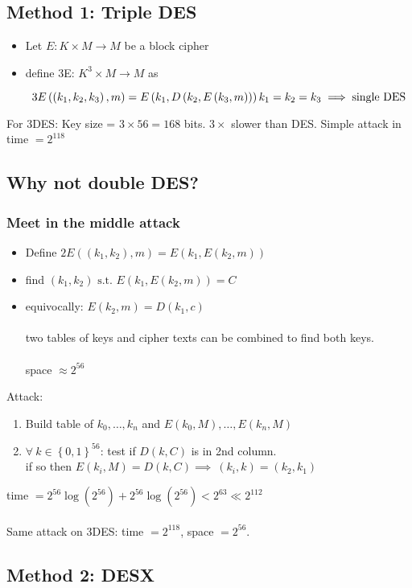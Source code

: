 \documentclass[a4paper]{article}
\begin{document}
	\subsection{Method 1: Triple DES}
	\begin{itemize}
		\item Let $E:K \times M \to M$ be a block cipher
		\item define 3E: $K^3\times M \to M$ as
			\begin{center}
				\[
				3E\left( \left( k_1,k_2,k_3 \right) ,m\right) 
				=E\left( k_1,D\left( k_2,E\left( k_3,m \right)  \right)  \right) \\
				k_1=k_2=k_3 \implies \text{single DES}
				\] 
			\end{center}
	\end{itemize}
	For 3DES: Key size = $3\times 56 = 168$ bits. $3\times $ slower than DES.
	Simple attack in time $=2^{118}$

	\subsection{Why not double DES?}
	\subsubsection{Meet in the middle attack}
	\begin{itemize}
		\item Define $2E\left( \left( k_1,k_2 \right) ,m \right) = E\left( k_1,E\left( k_2,m \right)  \right) $
		\item find $\left( k_1,k_2 \right) \text{ s.t.\ } E\left( k_1,E\left( k_2,m \right)  \right) =C$ \\
		\item equivocally: $E\left( k_2,m \right) = D\left( k_1,c \right) $ \\\\
		two tables of keys and cipher texts can be combined to find both keys.\\\\
		space $\approx 2^{56}$
	\end{itemize}
	Attack:
	\begin{enumerate}
		\item Build table of $k_0,\ldots,k_n$ and $E\left( k_0,M \right),\ldots, E\left( k_n,M \right) $ 
		\item $\forall\ k \in \left\{ 0,1 \right\}^{56} $:
			test if $D\left( k,C \right) $ is in 2nd column.\\
			if so then $E\left( k_i,M \right) =D\left( k,C \right) \implies\ \left( k_i,k \right) = \left( k_2,k_1 \right) $
	\end{enumerate}
	time $=2^{56}\log\left( 2^{56} \right) + 2^{56}\log\left( 2^{56} \right) < 2^{63} \ll 2^{112}$ \\\\
	Same attack on 3DES: time $= 2^{118}$, space $= 2^{56}$.
	\subsection{Method 2: DESX}
	
\end{document}
